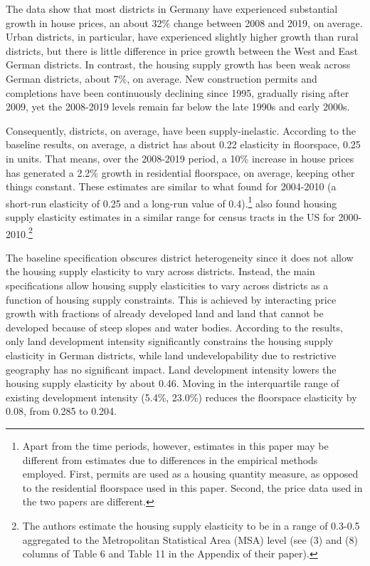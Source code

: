 \documentclass[
  12pt,
]{article}
\begin{document}
The data show that most districts in Germany have experienced
substantial growth in house prices, an about 32\% change between 2008
and 2019, on average. Urban districts, in particular, have experienced
slightly higher growth than rural districts, but there is little
difference in price growth between the West and East German districts.
In contrast, the housing supply growth has been weak across German
districts, about 7\%, on average. New construction permits and
completions have been continuously declining since 1995, gradually
rising after 2009, yet the 2008-2019 levels remain far below the late
1990s and early 2000s.

Consequently, districts, on average, have been supply-inelastic.
According to the baseline results, on average, a district has about 0.22
elasticity in floorspace, 0.25 in units. That means, over the 2008-2019
period, a 10\% increase in house prices has generated a 2.2\% growth in
residential floorspace, on average, keeping other things constant. These
estimates are similar to what \citet{lerbs_2014} found for 2004-2010 (a
short-run elasticity of 0.25 and a long-run value of 0.4).\footnote{Apart
  from the time periods, however, estimates in this paper may be
  different from \citet{lerbs_2014} estimates due to differences in the
  empirical methods employed. First, permits are used as a housing
  quantity measure, as opposed to the residential floorspace used in
  this paper. Second, the price data used in the two papers are
  different.} \citet{baum-snow_han_2019} also found housing supply
elasticity estimates in a similar range for census tracts in the US for
2000-2010.\footnote{The authors estimate the housing supply elasticity
  to be in a range of 0.3-0.5 aggregated to the Metropolitan Statistical
  Area (MSA) level (see (3) and (8) columns of Table 6 and Table 11 in
  the Appendix of their paper).}

The baseline specification obscures district heterogeneity since it does
not allow the housing supply elasticity to vary across districts.
Instead, the main specifications allow housing supply elasticities to
vary across districts as a function of housing supply constraints. This
is achieved by interacting price growth with fractions of already
developed land and land that cannot be developed because of steep slopes
and water bodies. According to the results, only land development
intensity significantly constrains the housing supply elasticity in
German districts, while land undevelopability due to restrictive
geography has no significant impact. Land development intensity lowers
the housing supply elasticity by about 0.46. Moving in the interquartile
range of existing development intensity (5.4\%, 23.0\%) reduces the
floorspace elasticity by 0.08, from 0.285 to 0.204.
\end{document}

